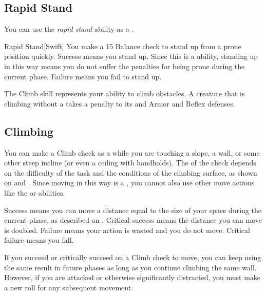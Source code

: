     \subsection{Rapid Stand}\label{Rapid Stand}
        You can use the \textit{rapid stand} ability as a .
        \begin{freeability}{Rapid Stand}[Swift]
            You make a  15 Balance check to stand up from a prone position quickly.
            Success means you stand up.
            Since this is a  ability, standing up in this way means you do not suffer the penalties for being prone during the current phase.
            Failure means you fail to stand up.
        \end{freeability}


\newpage
{}
    The Climb skill represents your ability to climb obstacles.
    A creature that is climbing without a  takes a  penalty to its  and Armor and Reflex defenses.

    \subsection{Climbing}
        You can make a Climb check as a  while you are touching a slope, a wall, or some other steep incline (or even a ceiling with handholds).
        The  of the check depends on the difficulty of the task and the conditions of the climbing surface, as shown on  and .
        Since moving in this way is a , you cannot also use other move actions like the  or  abilities.

        Success means you can move a distance equal to the size of your space during the current phase, as described on .
        Critical success means the distance you can move is doubled.
        Failure means your action is wasted and you do not move.
        Critical failure means you fall.

        If you succeed or critically succeed on a Climb check to move, you can keep using the same result in future phases as long as you continue climbing the same wall.
        However, if you are attacked or otherwise significantly distracted, you must make a new roll for any subsequent movement.

